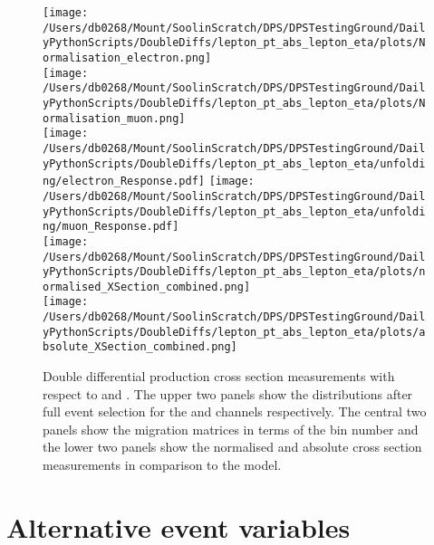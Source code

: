 \begin{figure}[htpb]
	\centering
	\texttt{[image: /Users/db0268/Mount/SoolinScratch/DPS/DPSTestingGround/DailyPythonScripts/DoubleDiffs/lepton\_pt\_abs\_lepton\_eta/plots/Normalisation\_electron.png]} \\
	\texttt{[image: /Users/db0268/Mount/SoolinScratch/DPS/DPSTestingGround/DailyPythonScripts/DoubleDiffs/lepton\_pt\_abs\_lepton\_eta/plots/Normalisation\_muon.png]} \\
	\vspace{0.8cm}
	\texttt{[image: /Users/db0268/Mount/SoolinScratch/DPS/DPSTestingGround/DailyPythonScripts/DoubleDiffs/lepton\_pt\_abs\_lepton\_eta/unfolding/electron\_Response.pdf]}
	\texttt{[image: /Users/db0268/Mount/SoolinScratch/DPS/DPSTestingGround/DailyPythonScripts/DoubleDiffs/lepton\_pt\_abs\_lepton\_eta/unfolding/muon\_Response.pdf]} \\
	\vspace{0.8cm}
	\texttt{[image: /Users/db0268/Mount/SoolinScratch/DPS/DPSTestingGround/DailyPythonScripts/DoubleDiffs/lepton\_pt\_abs\_lepton\_eta/plots/normalised\_XSection\_combined.png]} \\
	\texttt{[image: /Users/db0268/Mount/SoolinScratch/DPS/DPSTestingGround/DailyPythonScripts/DoubleDiffs/lepton\_pt\_abs\_lepton\_eta/plots/absolute\_XSection\_combined.png]} \\
	\vspace{0.4cm}
	\caption[Double differential \ttbar{} production cross section measurements with respect to \LPT{} and \LETA{}. The upper two panels show the distributions after full event selection for the \eJets{} and \muJets{} channels respectively. The central two panels show the migration matrices in terms of the bin number and the lower two panels show the normalised and absolute cross section measurements in comparison to the \powhegpythia{} model.]{Double differential \ttbar{} production cross section measurements with respect to \LPT{} and \LETA{}. The upper two panels show the distributions after full event selection for the \eJets{} and \muJets{} channels respectively. The central two panels show the migration matrices in terms of the bin number and the lower two panels show the normalised and absolute cross section measurements in comparison to the \powhegpythia{} model.}
	\label{fig:LPT_LETA}
\end{figure}


\section{Alternative event variables} %
\label{sec:additional_event_variables}

